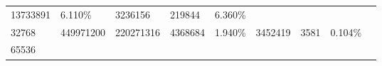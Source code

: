 \documentclass[11pt]{article}
\begin{document}
\begin{longtable}[]{@{}lllllllll@{}}
\begin{minipage}[t]{0.08\columnwidth}
13733891\strut
\end{minipage} & \begin{minipage}[t]{0.08\columnwidth}\raggedright\strut
6.110\%\strut
\end{minipage} & \begin{minipage}[t]{0.08\columnwidth}\raggedright\strut
3236156\strut
\end{minipage} & \begin{minipage}[t]{0.09\columnwidth}\raggedright\strut
219844\strut
\end{minipage} & \begin{minipage}[t]{0.09\columnwidth}\raggedright\strut
6.360\%\strut
\end{minipage} & \begin{minipage}[t]{0.06\columnwidth}\raggedright\strut
\strut
\end{minipage}\tabularnewline
\begin{minipage}[t]{0.12\columnwidth}\raggedright\strut
32768\strut
\end{minipage} & \begin{minipage}[t]{0.09\columnwidth}\raggedright\strut
449971200\strut
\end{minipage} & \begin{minipage}[t]{0.07\columnwidth}\raggedright\strut
220271316\strut
\end{minipage} & \begin{minipage}[t]{0.08\columnwidth}\raggedright\strut
4368684\strut
\end{minipage} & \begin{minipage}[t]{0.08\columnwidth}\raggedright\strut
1.940\%\strut
\end{minipage} & \begin{minipage}[t]{0.08\columnwidth}\raggedright\strut
3452419\strut
\end{minipage} & \begin{minipage}[t]{0.09\columnwidth}\raggedright\strut
3581\strut
\end{minipage} & \begin{minipage}[t]{0.09\columnwidth}\raggedright\strut
0.104\%\strut
\end{minipage} & \begin{minipage}[t]{0.06\columnwidth}\raggedright\strut
\strut
\end{minipage}\tabularnewline
\begin{minipage}[t]{0.12\columnwidth}\raggedright\strut
65536\strut
\end{minipage} & \begin{minipage}[t]{0.09\columnwidth}\raggedright\strut

\end{minipage}
\end{longtable}
\end{document}
